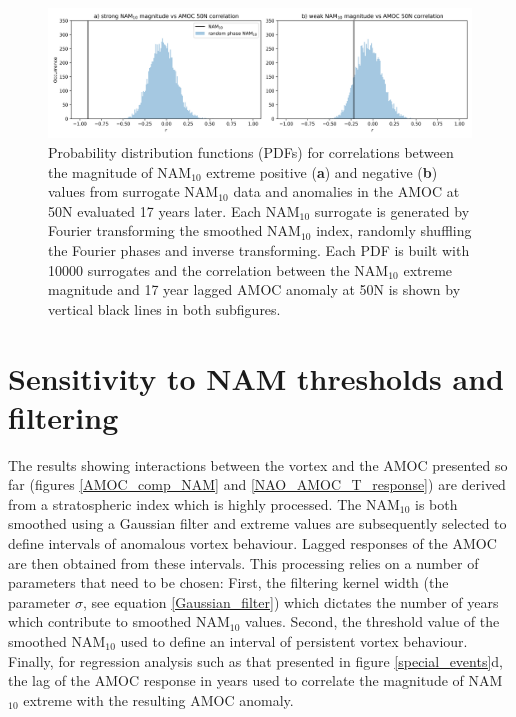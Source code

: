 \begin{center}
\begin{figure}[h!]
\noindent\includegraphics[width = \linewidth]{Figures/Figures-surface/correlation_stat_sigs.png}
\caption{Probability distribution functions (PDFs) for correlations between the magnitude of NAM$_{10}$ extreme positive (\textbf{a}) and negative (\textbf{b}) values from surrogate NAM$_{10}$ data and anomalies in the AMOC at 50N evaluated 17 years later. Each NAM$_{10}$ surrogate is generated by Fourier transforming the smoothed NAM$_{10}$ index, randomly shuffling the Fourier phases and inverse transforming. Each PDF is built with 10000 surrogates and the correlation between the NAM$_{10}$ extreme magnitude and 17 year lagged AMOC anomaly at 50N is shown by vertical black lines in both subfigures.}
\label{cors_stat_sigs}
\end{figure}
\end{center}

\section{Sensitivity to NAM thresholds and filtering}

The results showing interactions between the vortex and the AMOC presented so far (figures \ref{AMOC_comp_NAM} and \ref{NAO_AMOC_T_response}) are derived from a stratospheric index which is highly processed. The NAM$_{10}$ is both smoothed using a Gaussian filter and extreme values are subsequently selected to define intervals of anomalous vortex behaviour. Lagged responses of the AMOC are then obtained from these intervals. This processing relies on a number of parameters that need to be chosen: First, the filtering kernel width (the parameter $\sigma$, see equation \ref{Gaussian_filter}) which dictates the number of years which contribute to smoothed NAM$_{10}$ values. Second, the threshold value of the smoothed NAM$_{10}$ used to define an interval of persistent vortex behaviour. Finally, for regression analysis such as that presented in figure \ref{special_events}d, the lag of the AMOC response in years used to correlate the magnitude of NAM$_{10}$ extreme with the resulting AMOC anomaly. 

